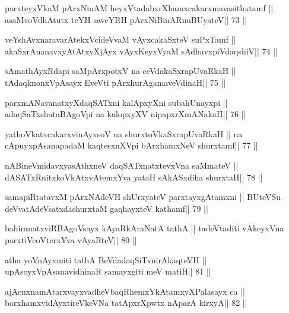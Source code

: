 \begin{shl}
parxteyxVkaM pArxNinAM heyxVtadabxrXhamxcakarxmavasithxtamf ||
asaMvoVdhAtutx teYH saveYRH pArxNiBinARnuBUyateV\hfill || 73 ||
\end{shl}

\begin{shl}
veYshAvxnaravarAtekxVcideVvaM vAyxcakaSxteV suPxTamf ||
akaSxrAnanavxyAtAtxyXjAyx vAyxKeyxVyaM sAdhavxpiVdaqshiV\hfill || 74 ||
\end{shl}

\begin{shl}
sAmathAyxRdapi saMpArxpotxV na ceVdakaSxrapUvaRkaH ||
tAdaqknonxVpAsayx EveVti pArxhurAgamaveVdinaH\hfill || 75 ||
\end{shl}

\begin{shl}
parxmANavanatxyXdaqSATxni kalApxyXni subahUnayxpi ||
adaqSaTxshataBAgoV\s pi na kalopxyXV nipapxrXmANakaH\hfill || 76 ||
\end{shl}

\begin{shl}
yathoVkatxcakarxvinAyxsoV na shurxtoV\s kaSxrapUvaRkaH ||
na cApuyxpAsanapadaM kaqtesxnXV\s pi bArxhamxNeV shurxtamf\hfill || 77 ||
\end{shl}

\begin{shl}
nABineVmidavxyasAthxneV daqSATxnatxtevxVna saMmateV ||
dASATxRnitxkoVkAtxvAtemxYva yataH sAkASxdiha shurxtaH\hfill || 78 ||
\end{shl}

\begin{shl}
samapiRtatavxM pArxNAdeVH shUrxyateV parxtayxgAtamxni ||
BUteVSu deVvatAdeVsatxdashurxtaM gaqhayxteV kathamf\hfill || 79 ||
\end{shl}

\begin{shl}
bahiranatxviRBAgoV\s sayx kAyaRkAraNatA tathA ||
tadeVtaditi vAkeyxVna parxtiVcoV\s terxYva vAyaRteV\hfill || 80 ||
\end{shl}

\begin{shl}
atha yoV\s nAyxmiti tathA BeVdadaqSiTxnirAkaqteVH ||
upAsoyxVpAsanavidhinaR samayxgiti meV matiH\hfill || 81 ||
\end{shl}

\begin{shl}
ajAcnxnamAtarxvayxvadheVbaqRhemxYkAtamxyXPalasayx ca ||
barxhamxvidAyxtireVkeVNa tatApxrXpwtx nAparA kirxyA\hfill || 82 ||
\end{shl}

